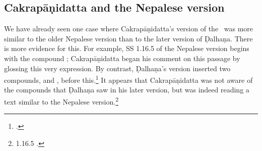 

 
\subsection{Cakrapāṇidatta and the Nepalese version}

We have already seen one case where Cakrapāṇidatta's version of the \SS\ was more
similar to the older Nepalese version than to the later version of Ḍalhaṇa.  There
is more evidence for this.  For example, SS 1.16.5 of the Nepalese version begins
with the compound ; Cakrapāṇidatta began his comment on this
passage by glossing this very expression. By contrast, Ḍalhaṇa's version inserted
two compounds,  and ,
before this.\footnote{.} It appears that Cakrapāṇidatta was not
    aware of the compounds that Ḍalhaṇa saw in his later version, but was indeed
    reading a text similar to the Nepalese version.\footnote{1.16.5
        \citep[126–127]{acar-1939}.}
        
